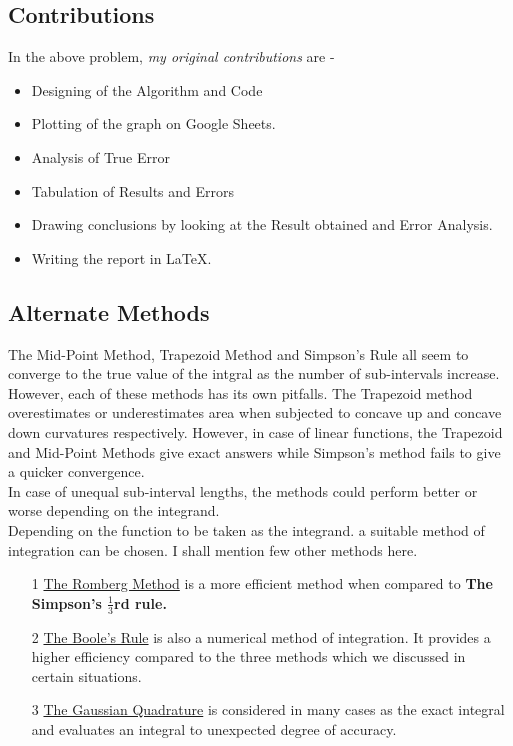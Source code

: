 \documentclass[titlepage, 11pt]{article}
\begin{document}

\subsection{Contributions}
In the above problem, \textit{my original contributions} are - 
\begin{itemize}
    \item Designing of the Algorithm and Code
    \item Plotting of the graph on Google Sheets. 
    \item Analysis of True Error
    \item Tabulation of Results and Errors
    \item Drawing conclusions by looking at the Result obtained and Error Analysis.
    \item Writing the report in LaTeX. 
\end{itemize}



\subsection{Alternate Methods}
The Mid-Point Method, Trapezoid Method and Simpson's Rule all seem to converge to the true value of the intgral as the number of sub-intervals increase. However, each of these methods has its own pitfalls. The Trapezoid method overestimates or underestimates area when subjected to concave up and concave down curvatures respectively. However, in case of linear functions, the Trapezoid and Mid-Point Methods give exact answers while Simpson's method fails to give a quicker convergence. \\
In case of unequal sub-interval lengths, the methods could perform better or worse depending on the integrand. \\
Depending on the function to be taken as the integrand. a suitable method of integration can be chosen. I shall mention few other methods here. \\
\begin{itemize}
    \item [1] \href{https://en.wikipedia.org/wiki/Romberg%27s_method}{The Romberg Method} is a more efficient method when compared to \textbf{The Simpson's $\frac{1}{3}$rd rule.}
    \item [2] \href{https://en.wikipedia.org/wiki/Boole%27s_rule}{The Boole's Rule} is also a numerical method of integration. It provides a higher efficiency compared to the three methods which we discussed in certain situations. 
    \item [3] \href{https://en.wikipedia.org/wiki/Gaussian_quadrature}{The Gaussian Quadrature} is considered in many cases as the exact integral and evaluates an integral to unexpected degree of accuracy. 
\end{itemize}
\end{document}
